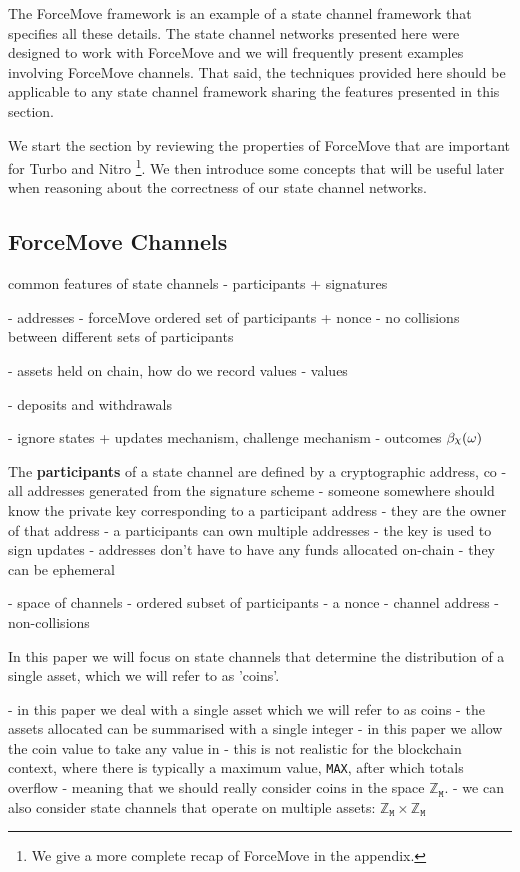 \documentclass{article}
\DeclareRobustCommand{\rchi}{{\mathpalette\irchi\relax}}
\newcommand{\irchi}[2]{\raisebox{\depth}{$#1\chi$}} %
\theoremstyle{definition}
\begin{document}
The ForceMove framework is an example of a state channel framework that specifies all these details. 
The state channel networks presented here were designed to work with ForceMove and we will frequently present examples involving ForceMove channels.
That said, the techniques provided here should be applicable to any state channel framework sharing the features presented in this section.

We start the section by reviewing the properties of ForceMove that are important for Turbo and Nitro \footnote{We give a more complete recap of ForceMove in the appendix.}. 
We then introduce some concepts that will be useful later when reasoning about the correctness of our state channel networks. 

\subsection{ForceMove Channels}

common features of state channels
- participants + signatures

- addresses - forceMove ordered set of participants + nonce
- no collisions between different sets of participants

- assets held on chain, how do we record values
- values

- deposits and withdrawals

- ignore states + updates mechanism, challenge mechanism
- outcomes $\beta_\rchi(\omega)$



The \textbf{participants} of a state channel are defined by a cryptographic address,
co
- all addresses generated from the signature scheme
- someone somewhere should know the private key corresponding to a participant address
- they are the owner of that address
- a participants can own multiple addresses
- the key is used to sign updates
- addresses don't have to have any funds allocated on-chain - they can be ephemeral

- space of channels
- ordered subset of participants
- a nonce
- channel address
- non-collisions

In this paper we will focus on state channels that determine the distribution of a single
asset, which we will refer to as 'coins'.

- in this paper we deal with a single asset which we will refer to as coins
- the assets allocated can be summarised with a single integer
- in this paper we allow the coin value to take any value in 
- this is not realistic for the blockchain context, where there is typically a maximum
  value, \texttt{MAX}, after which totals overflow
- meaning that we should really consider coins in the space 
$\mathbb{Z}_{\texttt{M}}$.
- we can also consider state channels that operate on multiple assets: $\mathbb{Z}_{\texttt{M}} \times \mathbb{Z}_{\texttt{M}}$
\end{document}
